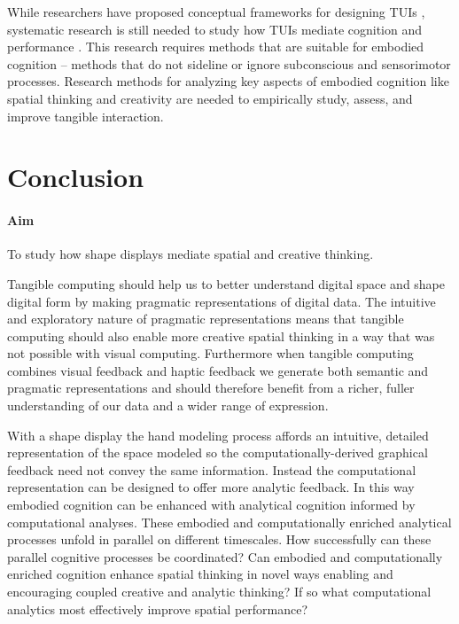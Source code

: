 \documentclass{article}
\begin{document}
While researchers have proposed conceptual frameworks for designing TUIs \citep{hornecker2006},
systematic research is still needed to study how TUIs mediate cognition and performance \citep{Esteves2012}. 
This research requires methods that are suitable for embodied cognition --
methods that do not sideline or ignore subconscious and sensorimotor processes. 
Research methods for analyzing key aspects of embodied cognition like spatial thinking and creativity
are needed to empirically study, assess, and improve tangible interaction. 



\clearpage


\section{Conclusion}

\paragraph{Aim} 
To study how shape displays mediate spatial and creative thinking.

Tangible computing should help us to better understand digital space and shape digital form by making pragmatic representations of digital data.
The intuitive and exploratory nature of pragmatic representations means that tangible computing should also enable more creative spatial thinking in a way that was not possible with visual computing.
Furthermore when tangible computing combines visual feedback and haptic feedback we generate both semantic and pragmatic representations and should therefore benefit from a richer, fuller understanding of our data and a wider range of expression.

With a shape display 
the hand modeling process affords an intuitive, detailed representation of the space modeled 
so the computationally-derived graphical feedback need not convey the same information. 
Instead the computational representation can be designed to offer more analytic feedback. 
In this way embodied cognition can be enhanced with analytical cognition informed by computational analyses. 
These embodied and computationally enriched analytical processes unfold in parallel on different timescales. 
How successfully can these parallel cognitive processes be coordinated? 
Can embodied and computationally enriched cognition enhance spatial thinking in novel ways
enabling and encouraging coupled creative and analytic thinking? 
If so what computational analytics most effectively improve spatial performance?
\end{document}
